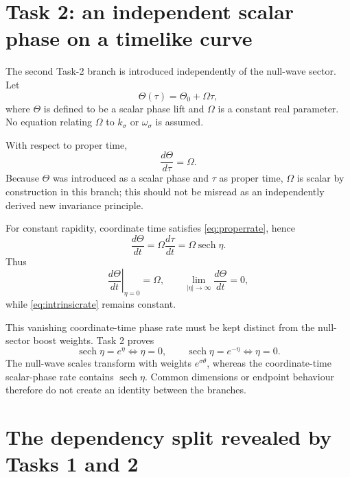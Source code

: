 \documentclass[11pt,a4paper]{article}
\newcommand{\sech}{\operatorname{sech}}
\begin{document}
\section{Task 2: an independent scalar phase on a timelike curve}

The second Task-2 branch is introduced independently of the null-wave sector.  Let
\begin{equation}
 \Theta(\tau)=\Theta_0+\Omega\tau,
\label{eq:scalarphase}
\end{equation}
where $\Theta$ is defined to be a scalar phase lift and $\Omega$ is a constant real parameter.  No equation relating $\Omega$ to $k_\sigma$ or $\omega_\sigma$ is assumed.

With respect to proper time,
\begin{equation}
 \frac{d\Theta}{d\tau}=\Omega.
\label{eq:intrinsicrate}
\end{equation}
Because $\Theta$ was introduced as a scalar phase and $\tau$ as proper time, $\Omega$ is scalar by construction in this branch; this should not be misread as an independently derived new invariance principle.

For constant rapidity, coordinate time satisfies \eqref{eq:properrate}, hence
\begin{equation}
 \frac{d\Theta}{dt}
 =\Omega\frac{d\tau}{dt}
 =\Omega\sech\eta.
\label{eq:coordrate}
\end{equation}
Thus
\begin{equation}
 \left.\frac{d\Theta}{dt}\right|_{\eta=0}=\Omega,
 \qquad
 \lim_{|\eta|\to\infty}\frac{d\Theta}{dt}=0,
\end{equation}
while \eqref{eq:intrinsicrate} remains constant.

This vanishing coordinate-time phase rate must be kept distinct from the null-sector boost weights.  Task 2 proves
\begin{equation}
 \sech\eta=e^{\eta}\iff\eta=0,
 \qquad
 \sech\eta=e^{-\eta}\iff\eta=0.
\end{equation}
The null-wave scales transform with weights $e^{\sigma\theta}$, whereas the coordinate-time scalar-phase rate contains $\sech\eta$.  Common dimensions or endpoint behaviour therefore do not create an identity between the branches.

\section{The dependency split revealed by Tasks 1 and 2}
\label{sec:missing}
\end{document}
